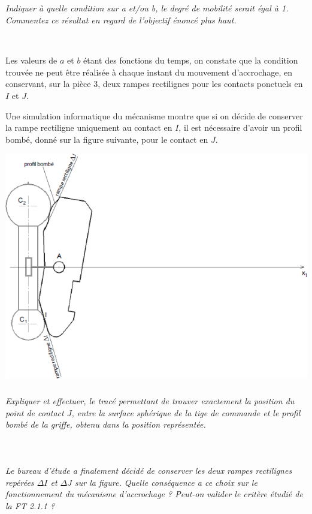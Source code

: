 \documentclass[10pt,fleqn]{article} %
\begin{document}
\begin{multicols}{2}
\subparagraph{}\textit{Indiquer à quelle condition sur a et/ou b, le degré de mobilité serait égal à 1. Commentez ce résultat en regard de l'objectif énoncé plus haut.}
\ifprof
\begin{corrige}~\\
\end{corrige}
\else
\fi

Les valeurs de $a$ et $b$ étant des fonctions du temps, on constate que la condition trouvée ne peut être réalisée
à chaque instant du mouvement d'accrochage, en conservant, sur la pièce 3, deux rampes rectilignes pour les
contacts ponctuels en $I$ et $J$.

Une simulation informatique du mécanisme montre que si on décide de conserver la rampe rectiligne
uniquement au contact en $I$, il est nécessaire d'avoir un profil bombé, donné sur la figure suivante, pour
le contact en $J$.

\begin{center}
\includegraphics[width=\linewidth]{images/fig_05}
\end{center}

\subparagraph{}\textit{Expliquer et effectuer, le tracé permettant de trouver exactement la position du
point de contact $J$, entre la surface sphérique de la tige de commande et le profil bombé de la griffe, obtenu
dans la position représentée.}
\ifprof
\begin{corrige}~\\
\end{corrige}
\else
\fi



\subparagraph{}\textit{Le bureau d'étude a finalement décidé de conserver les deux rampes rectilignes repérées $\Delta I$ et $\Delta J$ sur la figure. Quelle conséquence a ce choix sur le fonctionnement du mécanisme d'accrochage ?
Peut-on valider le critère étudié de la FT 2.1.1 ?}
\ifprof
\begin{corrige}~\\
\end{corrige}
\else
\fi



\end{multicols}
\end{document}
